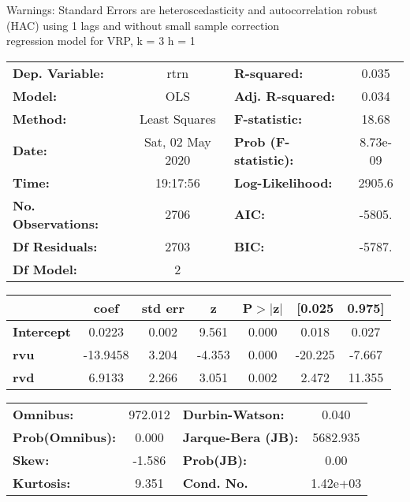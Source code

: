 Warnings: \newline
 [1] Standard Errors are heteroscedasticity and autocorrelation robust (HAC) using 1 lags and without small sample correction\\ 

regression model for VRP, k = 3 h = 1\begin{center}
\begin{tabular}{lclc}
\toprule
\textbf{Dep. Variable:}    &       rtrn       & \textbf{  R-squared:         } &     0.035   \\
\textbf{Model:}            &       OLS        & \textbf{  Adj. R-squared:    } &     0.034   \\
\textbf{Method:}           &  Least Squares   & \textbf{  F-statistic:       } &     18.68   \\
\textbf{Date:}             & Sat, 02 May 2020 & \textbf{  Prob (F-statistic):} &  8.73e-09   \\
\textbf{Time:}             &     19:17:56     & \textbf{  Log-Likelihood:    } &    2905.6   \\
\textbf{No. Observations:} &        2706      & \textbf{  AIC:               } &    -5805.   \\
\textbf{Df Residuals:}     &        2703      & \textbf{  BIC:               } &    -5787.   \\
\textbf{Df Model:}         &           2      & \textbf{                     } &             \\
\bottomrule
\end{tabular}
\begin{tabular}{lcccccc}
                   & \textbf{coef} & \textbf{std err} & \textbf{z} & \textbf{P$> |$z$|$} & \textbf{[0.025} & \textbf{0.975]}  \\
\midrule
\textbf{Intercept} &       0.0223  &        0.002     &     9.561  &         0.000        &        0.018    &        0.027     \\
\textbf{rvu}       &     -13.9458  &        3.204     &    -4.353  &         0.000        &      -20.225    &       -7.667     \\
\textbf{rvd}       &       6.9133  &        2.266     &     3.051  &         0.002        &        2.472    &       11.355     \\
\bottomrule
\end{tabular}
\begin{tabular}{lclc}
\textbf{Omnibus:}       & 972.012 & \textbf{  Durbin-Watson:     } &    0.040  \\
\textbf{Prob(Omnibus):} &   0.000 & \textbf{  Jarque-Bera (JB):  } & 5682.935  \\
\textbf{Skew:}          &  -1.586 & \textbf{  Prob(JB):          } &     0.00  \\
\textbf{Kurtosis:}      &   9.351 & \textbf{  Cond. No.          } & 1.42e+03  \\
\bottomrule
\end{tabular}
\end{center}

